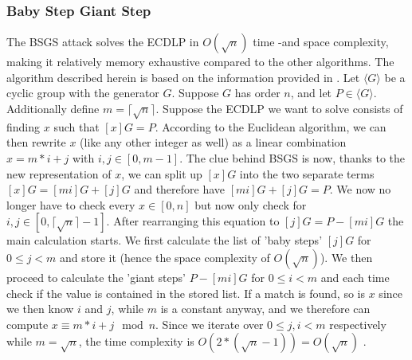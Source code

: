 \subsubsection{Baby Step Giant Step}
The BSGS attack solves the ECDLP in $O(\sqrt{n})$ time -and space complexity, making it relatively memory exhaustive compared to the other algorithms. 
The algorithm described herein is based on the information provided in \cite{article}.
Let $\langle G \rangle$ be a cyclic group with the generator $G$. Suppose $G$ has order $n$, and let $P \in \langle G \rangle$. Additionally define $m = \lceil \sqrt{n} \rceil$. Suppose the ECDLP we want to solve consists of finding $x$ such that $[x]G = P$. According to the Euclidean algorithm, we can then rewrite $x$ (like any other integer as well) as a linear combination $x =  m * i + j$ with $i, j \in [0, m-1]$. The clue behind BSGS is now, thanks to the new representation of $x$, we can split up $[x]G$ into the two separate terms $[x]G = [mi]G + [j]G$ and therefore have $[mi]G + [j]G = P$. We now no longer have to check every $x \in [0, n]$ but now only check for $i, j \in [0,  \lceil \sqrt{n} \rceil-1]$. After rearranging this equation to $[j]G = P - [mi]G$ the main calculation starts. We first calculate the list of 'baby steps' $[j]G$ for $0 \le j < m$ and store it (hence the space complexity of $O(\sqrt{n})$). We then proceed to calculate the 'giant steps' $P - [mi]G$ for  $0 \le i < m$ and each time check if the value is contained in the stored list. If a match is found, so is $x$ since we then know $i$ and $j$, while $m$ is a constant anyway, and we therefore can compute $x \equiv m*i + j \mod n$. Since we iterate over $0 \le j,i < m$ respectively while $m = \sqrt{n}$, the time complexity is $O(2 * (\sqrt{n} - 1)) = O(\sqrt{n})$ \cite{article}.

